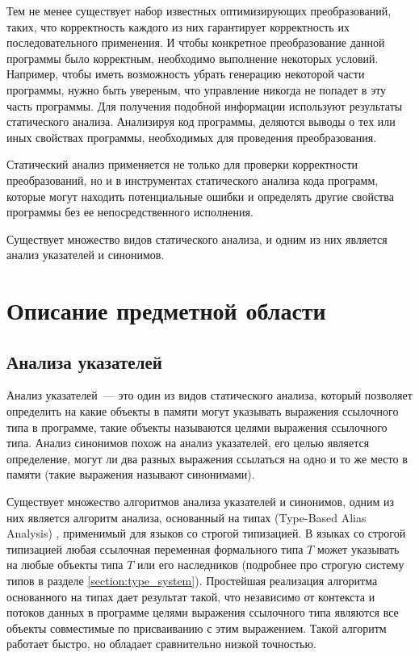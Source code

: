 \documentclass[14pt,titlepage]{extarticle}
\newcommand{\eng}[1]{{\English#1}}
\begin{document}
    Тем не менее существует набор известных оптимизирующих преобразований,
    таких, что корректность каждого из них гарантирует корректность их
    последовательного применения.
    И чтобы конкретное преобразование данной программы было корректным,
    необходимо выполнение некоторых условий. Например, чтобы иметь
    возможность убрать генерацию некоторой части программы, нужно быть
    увереным, что управление никогда не попадет в эту часть программы.
    Для получения подобной информации используют результаты статического
    анализа. Анализируя код программы, деляются выводы о тех или иных свойствах
    программы, необходимых для проведения преобразования.

    Статический анализ применяется не только для проверки
    корректности преобразований, но и в инструментах статического анализа
    кода программ, которые могут находить потенциальные ошибки и определять
    другие свойства программы без ее непосредственного исполнения.

    Существует множество видов статического анализа, и одним из них
    является анализ указателей и синонимов.

  \newpage
  \section{Описание предметной области}

    \subsection{Анализа указателей}
    \label{section:analysis_overview}

      Анализ указателей~--- это один из видов статического анализа, который
      позволяет определить на какие объекты в памяти могут указывать выражения
      ссылочного типа в программе, такие объекты называются целями выражения
      ссылочного типа. Анализ синонимов похож на анализ указателей, его целью
      является определение, могут ли два разных выражения ссылаться на одно и то
      же место в памяти (такие выражения называют синонимами).

      Существует множество алгоритмов анализа указателей и синонимов,
      одним из них является алгоритм анализа, основанный на типах
      (\eng{Type-Based Alias Analysis}) \cite{diwan_tbaa},
      применимый для языков со строгой типизацией.
      В языках со строгой типизацией любая ссылочная переменная формального типа
      $T$ может указывать на любые объекты типа $T$ или его наследников
      (подробнее про строгую систему типов в разделе \ref{section:type_system}).
      Простейшая реализация алгоритма основанного на типах дает результат такой,
      что независимо от контекста и потоков данных в программе целями выражения
      ссылочного типа являются все объекты совместимые по присваиванию с этим
      выражением.
      Такой алгоритм работает быстро, но обладает сравнительно низкой точностью.
\end{document}
